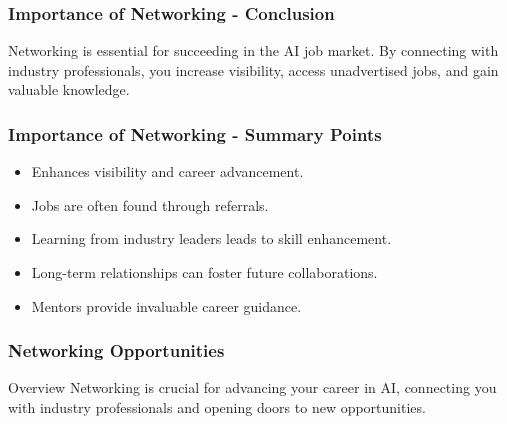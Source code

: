 \documentclass{beamer}
\begin{document}
\begin{frame}[fragile]
    \frametitle{Importance of Networking - Conclusion}
    Networking is essential for succeeding in the AI job market. By connecting with industry professionals, you increase visibility, access unadvertised jobs, and gain valuable knowledge.
\end{frame}

\begin{frame}[fragile]
    \frametitle{Importance of Networking - Summary Points}
    \begin{itemize}
        \item Enhances visibility and career advancement.
        \item Jobs are often found through referrals.
        \item Learning from industry leaders leads to skill enhancement.
        \item Long-term relationships can foster future collaborations.
        \item Mentors provide invaluable career guidance.
    \end{itemize}
\end{frame}

\begin{frame}[fragile]
    \frametitle{Networking Opportunities}
    \begin{block}{Overview}
        Networking is crucial for advancing your career in AI, connecting you with industry professionals and opening doors to new opportunities. 
    \end{block}
\end{frame}
\end{document}
